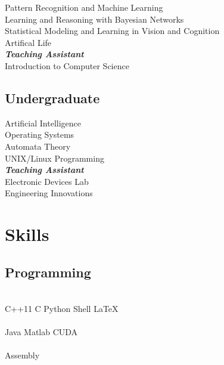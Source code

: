 \documentclass[letterpaper]{deedy-resume} %
\begin{document}
\begin{minipage}[t]{0.27\textwidth}
Pattern Recognition and Machine Learning\\
Learning and Reasoning with Bayesian Networks\\
Statistical Modeling and Learning in Vision and Cognition\\
Artifical Life\\
{\footnotesize \textit{\textbf{Teaching Assistant}}} \\
Introduction to Computer Science

\sectionspace %


\subsection{Undergraduate}

Artificial Intelligence \\
Operating Systems \\
Automata Theory\\
UNIX/Linux Programming \\
{\footnotesize \textit{\textbf{Teaching Assistant}}} \\
Electronic Devices Lab\\
Engineering Innovations

\sectionspace %


\section{Skills}

\subsection{Programming}

 \\
C++11 \textbullet{} C \textbullet{} Python \textbullet{} Shell \textbullet{} \LaTeX\ \\
 \\
Java \textbullet{} Matlab \textbullet{} CUDA \\
 \\
Assembly

\sectionspace %


\end{minipage} %
\end{document}
